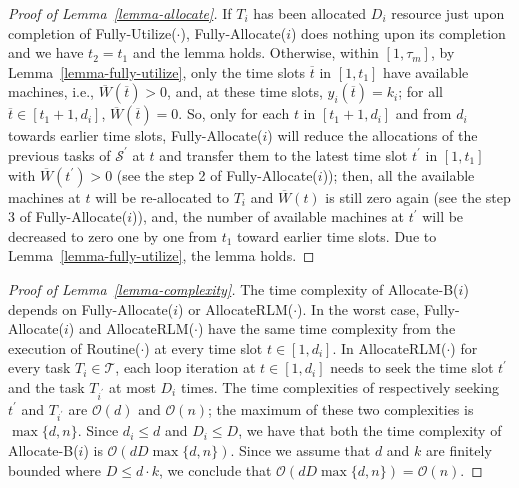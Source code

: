\documentclass[10pt,journal,compsoc]{IEEEtran}
\begin{document}
\begin{proof}[Proof of Lemma~\ref{lemma-allocate}]
 If $T_{i}$ has been allocated $D_{i}$ resource just upon completion of Fully-Utilize($\cdot$), Fully-Allocate($i$) does nothing upon its completion and we have $t_{2}=t_{1}$ and the lemma holds. Otherwise, within $[1, \tau_{m}]$, by Lemma~\ref{lemma-fully-utilize}, only the time slots $\overline{t}$ in $[1, t_{1}]$ have available machines, i.e., $\overline{W}(\overline{t})>0$, and, at these time slots, $y_{i}(\overline{t})=k_{i}$; for all $\overline{t}\in[t_{1}+1, d_{i}]$, $\overline{W}(\overline{t})=0$. So, only for each $t$ in $[t_{1}+1, d_{i}]$ and from $d_{i}$ towards earlier time slots, Fully-Allocate($i$) will reduce the allocations of the previous tasks of $\mathcal{S}^{\prime}$ at $t$ and transfer them to the latest time slot $t^{\prime}$ in $[1, t_{1}]$ with $\overline{W}(t^{\prime})>0$ (see the step 2 of Fully-Allocate($i$)); then, all the available machines at $t$ will be re-allocated to $T_{i}$ and $\overline{W}(t)$ is still zero again (see the step 3 of Fully-Allocate($i$)), and, the number of available machines at $t^{\prime}$ will be decreased to zero one by one from $t_{1}$ toward earlier time slots. Due to Lemma~\ref{lemma-fully-utilize}, the lemma holds.
\end{proof}


\begin{proof}[Proof of Lemma~\ref{lemma-complexity}]
The time complexity of Allocate-B($i$) depends on Fully-Allocate($i$) or AllocateRLM($\cdot$). In the worst case, Fully-Allocate($i$) and AllocateRLM($\cdot$) have the same time complexity from the execution of Routine($\cdot$) at every time slot $t\in[1, d_{i}]$. In AllocateRLM($\cdot$) for every task $T_{i}\in\mathcal{T}$, each loop iteration at $t\in[1, d_{i}]$ needs to seek the time slot $t^{\prime}$ and the task $T_{i^{\prime}}$ at most $D_{i}$ times. The time complexities of respectively seeking $t^{\prime}$ and $T_{i^{\prime}}$ are $\mathcal{O}(d)$ and $\mathcal{O}(n)$; the maximum of these two complexities is $\max\{d, n\}$. Since $d_{i}\leq d$ and $D_{i}\leq D$, we have that both the time complexity of Allocate-B($i$) is $\mathcal{O}(dD\max\{d, n\})$. Since we assume that $d$ and $k$ are finitely bounded where $D\leq d\cdot k$, we conclude that $\mathcal{O}(dD\max\{d, n\})=\mathcal{O}(n)$.\end{proof}
\end{document}
